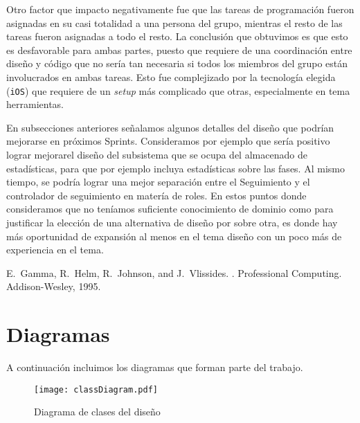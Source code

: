\documentclass[10pt, a4paper,english,spanish]{article}
\begin{document}
Otro factor que impacto negativamente fue que las tareas de programación fueron asignadas en su casi totalidad a una persona del grupo, mientras el resto de las tareas fueron asignadas a todo el resto. La conclusión que obtuvimos es que esto es desfavorable para ambas partes, puesto que requiere de una coordinación entre diseño y código que no sería tan necesaria si todos los miembros del grupo están involucrados en ambas tareas. Esto fue complejizado por la tecnología elegida (\texttt{iOS}) que requiere de un \textit{setup} más complicado que otras, especialmente en tema herramientas.

En subsecciones anteriores señalamos algunos detalles del diseño que podrían mejorarse en próximos Sprints. Consideramos por ejemplo que sería positivo lograr mejorarel diseño del subsistema que se ocupa del almacenado de estadísticas, para que por ejemplo incluya estadísticas sobre las fases. Al mismo tiempo, se podría lograr una mejor separación entre el Seguimiento y el controlador de seguimiento en matería de roles. En estos puntos donde consideramos que no teníamos suficiente conocimiento de dominio como para justificar la elección de una alternativa de diseño por sobre otra, es donde hay más oportunidad de expansión al menos en el tema diseño con un poco más de experiencia en el tema.

\begin{thebibliography}{8}
\raggedright

	E.~Gamma, R.~Helm, R.~Johnson, and J.~Vlissides.
	.
	\newblock Professional Computing. Addison-Wesley, 1995.

\end{thebibliography}

\section{Diagramas}

A continuación incluimos los diagramas que forman parte del trabajo.

\begin{landscape}
	\begin{figure}[h]
		\caption{Diagrama de clases del diseño}
		\label{diag_diseno}
		\texttt{[image: classDiagram.pdf]}
	\end{figure} 
\end{landscape}
\end{document}

